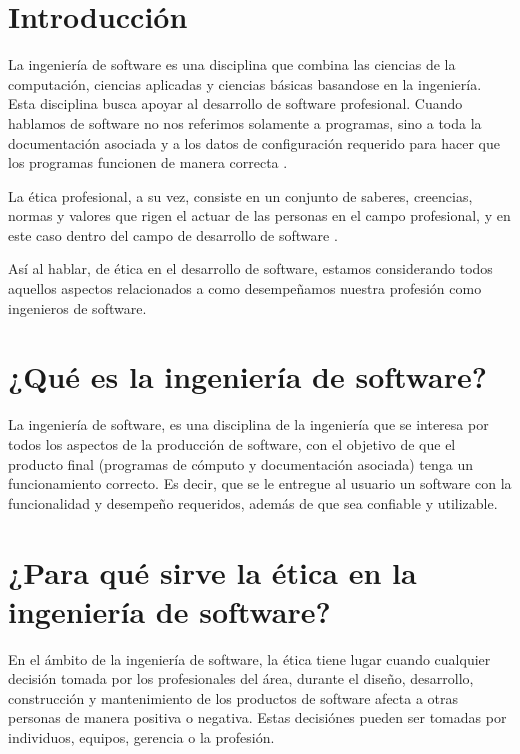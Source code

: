 \documentclass[twoside]{article}
\begin{document}
\begin{multicols}{2} %

\section{Introducción}

La ingeniería de software es una disciplina que combina las ciencias de la
computación, ciencias aplicadas y ciencias básicas basandose en la ingeniería.
Esta disciplina busca apoyar al desarrollo de software profesional. Cuando
hablamos de software no nos referimos solamente a programas, sino a toda la
documentación  asociada y a los datos de configuración requerido para hacer que
los programas funcionen de manera correcta \cite{sommerville2005ingenieria}.

La ética profesional, a su vez, consiste en un conjunto de saberes, creencias,
normas y valores que rigen el actuar de las personas en el campo profesional, y
en este caso dentro del campo de desarrollo de software
\cite{yuren2013etica}.

Así al hablar, de ética en el desarrollo de software, estamos considerando todos
aquellos aspectos relacionados a como desempeñamos nuestra profesión como
ingenieros de software.

\section{¿Qué es la ingeniería de software?}

La ingeniería de software, es una disciplina de la ingeniería que se interesa
por todos los aspectos de la producción de software, con el objetivo de que el
producto final (programas de cómputo y documentación asociada) tenga un
funcionamiento correcto. Es decir, que se le entregue al usuario un software con
la funcionalidad y desempeño requeridos, además de que sea confiable y
utilizable.

\section{¿Para qué sirve la ética en la ingeniería de software?}

En el ámbito de la ingeniería de software, la ética tiene lugar cuando cualquier
decisión tomada por los profesionales del área, durante el diseño, desarrollo,
construcción y mantenimiento de los productos de software afecta a otras
personas de manera positiva o negativa. Estas decisiónes pueden ser tomadas por
individuos, equipos, gerencia o la profesión.


\end{multicols}
\end{document}
